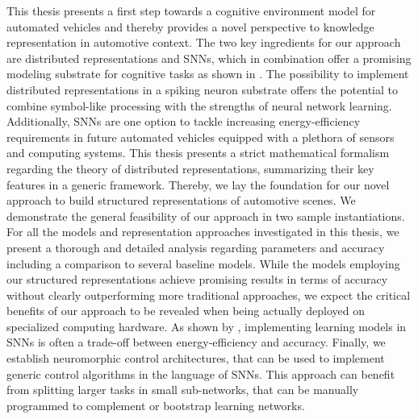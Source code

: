This thesis presents a first step towards a cognitive environment model for automated vehicles and thereby provides a novel perspective to knowledge representation in automotive context.
The two key ingredients for our approach are distributed representations and \acp{SNN}, which in combination offer a promising modeling substrate for cognitive tasks as shown in \textcite{Eliasmith2013, Eliasmith2012}. 
The possibility to implement distributed representations in a spiking neuron substrate offers the potential to combine symbol-like processing with the strengths of neural network learning.
Additionally, \acp{SNN} are one option to tackle increasing energy-efficiency requirements in future automated vehicles equipped with a plethora of sensors and computing systems.
This thesis presents a strict mathematical formalism regarding the theory of distributed representations, summarizing their key features in a generic framework.
Thereby, we lay the foundation for our novel approach to build structured representations of automotive scenes.
We demonstrate the general feasibility of our approach in two sample instantiations.
For all the models and representation approaches investigated in this thesis, we present a thorough and detailed analysis regarding parameters and accuracy including a comparison to several baseline models.
While the models employing our structured representations achieve promising results in terms of accuracy without clearly outperforming more traditional approaches, we expect the critical benefits of our approach to be revealed when being actually deployed on specialized computing hardware. 
As shown by \textcite{Hunsberger2016}, implementing learning models in \acp{SNN} is often a trade-off between energy-efficiency and accuracy.
Finally, we establish neuromorphic control architectures, that can be used to implement generic control algorithms in the language of \acp{SNN}.
This approach can benefit from splitting larger tasks in small sub-networks, that can be manually programmed to complement or bootstrap learning networks.

